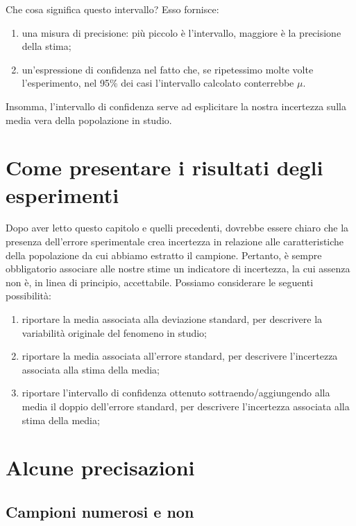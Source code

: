 \documentclass[a4paper,12pt,oneside]{book}
\providecommand{\tightlist}{%
  \setlength{\itemsep}{0pt}\setlength{\parskip}{0pt}}
\theoremstyle{definition}
\theoremstyle{definition}
\theoremstyle{definition}
\theoremstyle{remark}
\begin{document}
Che cosa significa questo intervallo? Esso fornisce:

\begin{enumerate}
\def\labelenumi{\arabic{enumi}.}
\tightlist
\item
  una misura di precisione: più piccolo è l'intervallo, maggiore è la
  precisione della stima;
\item
  un'espressione di confidenza nel fatto che, se ripetessimo molte volte
  l'esperimento, nel 95\% dei casi l'intervallo calcolato conterrebbe
  \(\mu\).
\end{enumerate}

Insomma, l'intervallo di confidenza serve ad esplicitare la nostra
incertezza sulla media vera della popolazione in studio.

\section{Come presentare i risultati degli
esperimenti}\label{come-presentare-i-risultati-degli-esperimenti}

Dopo aver letto questo capitolo e quelli precedenti, dovrebbe essere
chiaro che la presenza dell'errore sperimentale crea incertezza in
relazione alle caratteristiche della popolazione da cui abbiamo estratto
il campione. Pertanto, è sempre obbligatorio associare alle nostre stime
un indicatore di incertezza, la cui assenza non è, in linea di
principio, accettabile. Possiamo considerare le seguenti possibilità:

\begin{enumerate}
\def\labelenumi{\arabic{enumi}.}
\tightlist
\item
  riportare la media associata alla deviazione standard, per descrivere
  la variabilità originale del fenomeno in studio;
\item
  riportare la media associata all'errore standard, per descrivere
  l'incertezza associata alla stima della media;
\item
  riportare l'intervallo di confidenza ottenuto sottraendo/aggiungendo
  alla media il doppio dell'errore standard, per descrivere l'incertezza
  associata alla stima della media;
\end{enumerate}

\section{Alcune precisazioni}\label{alcune-precisazioni}

\subsection{Campioni numerosi e non}\label{campioni-numerosi-e-non}
\end{document}
